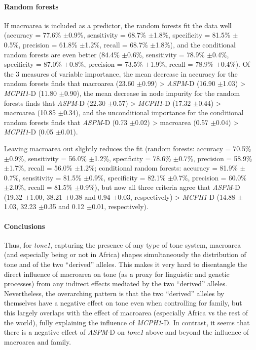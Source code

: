 \documentclass[twoside,twocolumn]{article}
\begin{document}
\paragraph{Random forests}

If macroarea is included as a predictor, the random forests fit the data well (accuracy = 77.6\% $\pm$0.9\%, sensitivity = 68.7\% $\pm$1.8\%, specificity = 81.5\% $\pm$0.5\%, precision = 61.8\% $\pm$1.2\%, recall = 68.7\% $\pm$1.8\%), and the conditional random forests are even better (84.4\% $\pm$0.6\%, sensitivity = 78.9\% $\pm$0.4\%, specificity = 87.0\% $\pm$0.8\%, precision = 73.5\% $\pm$1.9\%, recall = 78.9\% $\pm$0.4\%).
Of the 3 measures of variable importance, the mean decrease in accuracy for the random forests finds that macroarea (23.60 $\pm$0.99) > \textit{ASPM}-D (16.90 $\pm$1.03) > \textit{MCPH1}-D (11.80 $\pm$0.90), the mean decrease in node impurity for the random forests finds that \textit{ASPM}-D (22.30 $\pm$0.57) > \textit{MCPH1}-D (17.32 $\pm$0.44) > macroarea (10.85 $\pm$0.34), and the unconditional importance for the conditional random forests finds that \textit{ASPM}-D (0.73 $\pm$0.02) > macroarea (0.57 $\pm$0.04) > \textit{MCPH1}-D (0.05 $\pm$0.01).

Leaving macroarea out slightly reduces the fit (random forests: accuracy = 70.5\% $\pm$0.9\%, sensitivity = 56.0\% $\pm$1.2\%, specificity = 78.6\% $\pm$0.7\%, precision = 58.9\% $\pm$1.7\%, recall = 56.0\% $\pm$1.2\%; conditional random forests: accuracy = 81.9\% $\pm$0.7\%, sensitivity = 81.5\% $\pm$0.9\%, specificity = 82.1\% $\pm$0.7\%, precision = 60.0\% $\pm$2.0\%, recall = 81.5\% $\pm$0.9\%), but now all three criteria agree that \textit{ASPM}-D (19.32 $\pm$1.00, 38.21 $\pm$0.38 and 0.94 $\pm$0.03, respectively) > \textit{MCPH1}-D (14.88 $\pm$1.03, 32.23 $\pm$0.35 and 0.12 $\pm$0.01, respectively).


\paragraph{Conclusions}

Thus, for \textit{tone1}, capturing the presence of any type of tone system, macroarea (and especially being or not in Africa) shapes simultaneously the distribution of tone and of the two ``derived'' alleles.
This makes it very hard to disentangle the direct influence of macroarea on tone (as a proxy for linguistic and genetic processes) from any indirect effects mediated by the two ``derived'' alleles.
Nevertheless, the overarching pattern is that the two ``derived'' alleles by themselves have a negative effect on tone even when controlling for family, but this largely overlaps with the effect of macroarea (especially Africa vs the rest of the world), fully explaining the influence of \textit{MCPH1}-D.
In contrast, it seems that there is a negative effect of \textit{ASPM}-D on \textit{tone1} above and beyond the influence of macroarea and family.
\end{document}

